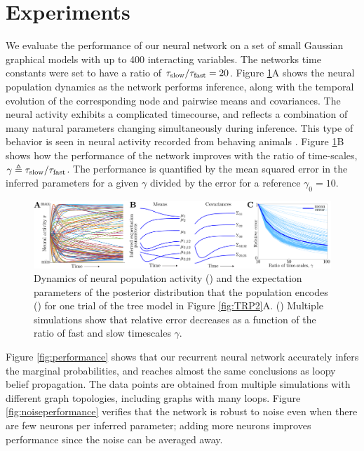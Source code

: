 \documentclass{article}
\begin{document}
 
 \section{Experiments}
 \label{Experiments} 
 
We evaluate the performance of our neural network on a set of small Gaussian graphical models with up to 400 interacting variables. The networks time constants were set to have a ratio of $\tau_{\rm slow}/\tau_{\rm fast}=20$. Figure \ref{fig:dynamics}A shows the neural population dynamics as the network performs inference, along with the temporal evolution of the corresponding node and pairwise means and covariances. The neural activity exhibits a complicated timecourse, and reflects a combination of many natural parameters changing simultaneously during inference. This type of behavior is seen in neural activity recorded from behaving animals \cite{hayden2010neurons,rigotti2013importance,raposo2014category}. Figure \ref{fig:dynamics}B shows how the performance of the network improves with the ratio of time-scales, $\gamma \triangleq \tau_{\rm slow}/\tau_{\rm fast}$. The performance is quantified by the mean squared error in the inferred parameters for a given $\gamma$ divided by the error for a reference $\gamma_0=10$.

 \begin{figure}[h]
 	\centering
 	\includegraphics[width=.95\textwidth]{Figures/Results1.pdf}
 	\caption{Dynamics of neural population activity (\bA) and the expectation parameters of the posterior distribution that the population encodes (\bB) for one trial of the tree model in Figure \ref{fig:TRP2}A. (\bC) Multiple simulations show that relative error decreases as a function of the ratio of fast and slow timescales $\gamma$.}
 	\label{fig:dynamics}
 \end{figure}
 
Figure \ref{fig:performance} shows that our recurrent neural network accurately infers the marginal probabilities, and reaches almost the same conclusions as loopy belief propagation. The data points are obtained from multiple simulations with different graph topologies, including graphs with many loops. Figure \ref{fig:noiseperformance} verifies that the network is robust to noise even when there are few neurons per inferred parameter; adding more neurons improves performance since the noise can be averaged away.
 
\end{document}
